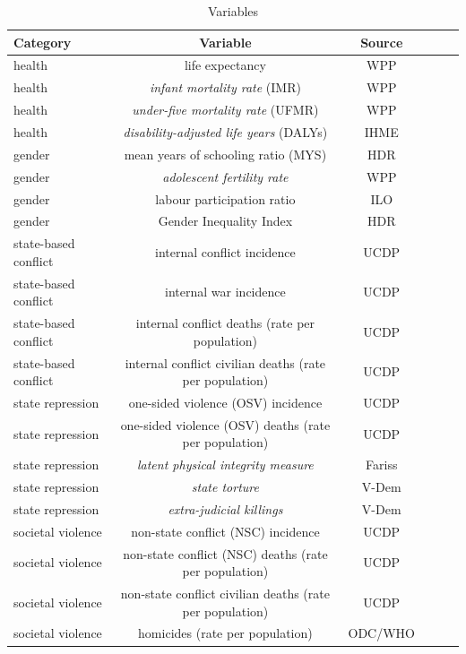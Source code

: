 \documentclass[12pt]{article}
\begin{document}
\begin{table}[!htbp]
\small
\centering
\caption{Variables}
\label{table_vars}
\begin{tabular}{lccccc}
\toprule
Category             & Variable                                                 & Source  \\
\midrule
health               & life expectancy                                          & WPP     \\
health               & \textit{infant mortality rate} (IMR)                     & WPP     \\
health               & \textit{under-five mortality rate} (UFMR)                & WPP     \\
health               & \textit{disability-adjusted life years} (DALYs)          & IHME    \\
gender               & mean years of schooling ratio (MYS)                      & HDR     \\
gender               & \textit{adolescent fertility rate}                       & WPP     \\
gender               & labour participation ratio                               & ILO     \\
gender               & Gender Inequality Index                                  & HDR     \\
state-based conflict & internal conflict incidence                              & UCDP    \\
state-based conflict & internal war incidence                                   & UCDP    \\
state-based conflict & internal conflict deaths (rate per population)           & UCDP    \\
state-based conflict & internal conflict civilian deaths (rate per population)  & UCDP    \\
state repression     & one-sided violence (OSV) incidence                       & UCDP    \\
state repression     & one-sided violence (OSV) deaths (rate per population)    & UCDP    \\
state repression     & \textit{latent physical integrity measure}               & Fariss  \\
state repression     & \textit{state torture}                                   & V-Dem   \\
state repression     & \textit{extra-judicial killings}                         & V-Dem   \\
societal violence    & non-state conflict (NSC) incidence                       & UCDP    \\
societal violence    & non-state conflict (NSC) deaths (rate per population)    & UCDP    \\
societal violence    & non-state conflict civilian deaths (rate per population) & UCDP    \\
societal violence    & homicides (rate per population)                          & ODC/WHO \\
\bottomrule
\end{tabular}
\end{table}
\end{document}
